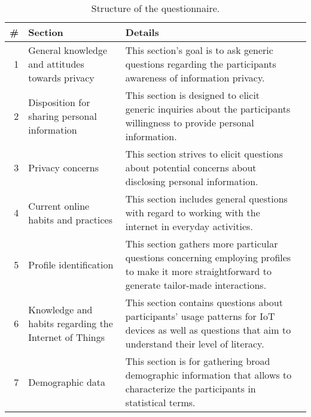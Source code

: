\begin{table}[H]
    \begin{center}
        \begin{tabular}{r *{3}{ p{6cm} }}
            \hline
            \textbf{\#}\hspace{0.5cm} & \textbf{Section} & \textbf{Details} \\
            \hline
            1\hspace{0.5cm} & General knowledge and attitudes towards privacy & This
            section's goal is to ask generic questions regarding the participants awareness
            of information privacy. \\
            \hline
            2\hspace{0.5cm} & Disposition for sharing personal information & This
            section is designed to elicit generic inquiries about the participants
            willingness to provide personal information. \\
            \hline
            3\hspace{0.5cm} & Privacy concerns & This section strives to
            elicit questions about potential concerns about disclosing
            personal information. \\
            \hline
            4\hspace{0.5cm} & Current online habits and practices & This
            section includes general questions with regard to working with
            the internet in everyday activities. \\
            \hline
            5\hspace{0.5cm} & Profile identification & This section gathers
            more particular questions concerning employing profiles to make
            it more straightforward to generate tailor-made interactions. \\
            \hline
            6\hspace{0.5cm} & Knowledge and habits regarding the Internet
            of Things & This section contains questions about participants'
            usage patterns for IoT devices as well as questions that aim to
            understand their level of literacy. \\
            \hline
            7\hspace{0.5cm} & Demographic data & This section is for
            gathering broad demographic information that allows
            to characterize the participants in statistical terms. \\
            \hline
        \end{tabular}
    \end{center}
    \vspace{1em}
    \caption{Structure of the questionnaire.}
    \label{table:questionnaire}
\end{table}

